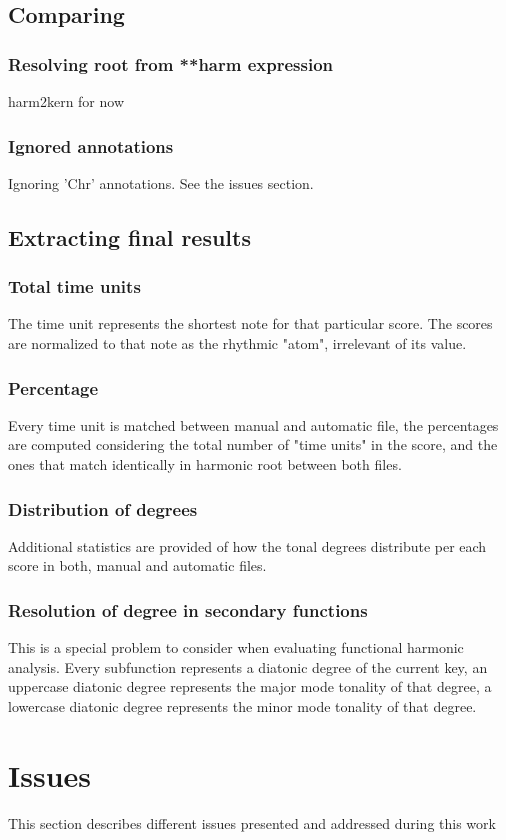 	\subsection{Comparing}
		\subsubsection{Resolving root from **harm expression}
    harm2kern for now
		\subsubsection{Ignored annotations}
    Ignoring 'Chr' annotations. See the issues section.
	\subsection{Extracting final results}
		\subsubsection{Total time units}
    The time unit represents the shortest note for that particular score. The scores are normalized to that note as the rhythmic "atom", irrelevant of its value.
		\subsubsection{Percentage}
    Every time unit is matched between manual and automatic file, the percentages are computed considering the total number of "time units" in the score, and the ones that match identically in harmonic root between both files.
		\subsubsection{Distribution of degrees}
    Additional statistics are provided of how the tonal degrees distribute per each score in both, manual and automatic files.
		\subsubsection{Resolution of degree in secondary functions}
    This is a special problem to consider when evaluating functional harmonic analysis. Every subfunction represents a diatonic degree of the current key, an uppercase diatonic degree represents the major mode tonality of that degree, a lowercase diatonic degree represents the minor mode tonality of that degree.
\section{Issues}
This section describes different issues presented and addressed during this work
